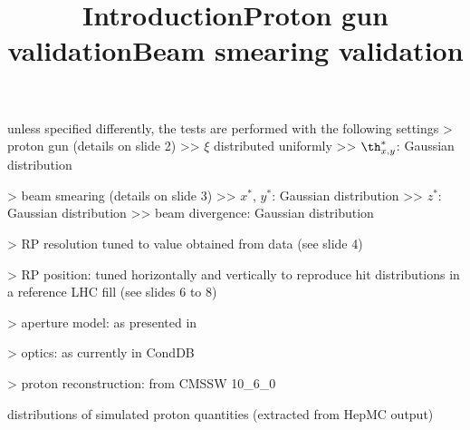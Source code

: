 \def\today{%
	\number\day
	\space
	\ifcase\month\or
	January\or February\or March\or April\or May\or June\or
	July\or August\or September\or October\or November\or December
	\fi
	\space
	\number\year
}

\newpage %

\def\author{J.~Kašpar}
\def\caption{Proton simulation validation, \PeriodLabel}
\def\date{\today}

\iffalse
* single-rp reco

* multi-rp reco
 - resolution
 - impact of misalignment
 - impact of optics systematics
\fi

\newpage %
\title{Introduction}

\> unless specified differently, the tests are performed with the following settings
\>> proton gun (details on slide 2)
\>>> $\xi$ distributed uniformly
\>>> $\th^*_{x, y}$: Gaussian distribution

\>> beam smearing (details on slide 3)
\>>> $x^*$, $y^*$: Gaussian distribution
\>>> $z^*$: Gaussian distribution
\>>> beam divergence: Gaussian distribution

\>> RP resolution tuned to value obtained from data (see slide 4)

\>> RP position: tuned horizontally and vertically to reproduce hit distributions in a reference LHC fill (see slides 6 to 8)

\>> aperture model: as presented in 

\>> optics: as currently in CondDB

\>> proton reconstruction: from CMSSW 10\_6\_0


\newpage %
\title{Proton gun validation}

\SmallerFonts

\> distributions of simulated proton quantities (extracted from HepMC output)

\centerline{}



\newpage %
\title{Beam smearing validation}

